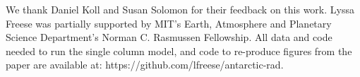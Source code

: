 \documentclass[draft]{agujournal2019}
\begin{document}
%
%
%
%
%
%
%
%


\acknowledgments
We thank Daniel Koll and Susan Solomon for their feedback on this work. Lyssa Freese was partially supported by MIT's Earth, Atmosphere and Planetary Science Department's Norman C. Rasmussen Fellowship. All data and code needed to run the single column model, and code to re-produce figures from the paper are available at: https://github.com/lfreese/antarctic-rad. 



%
%





%
%
%
%
%
\end{document}
